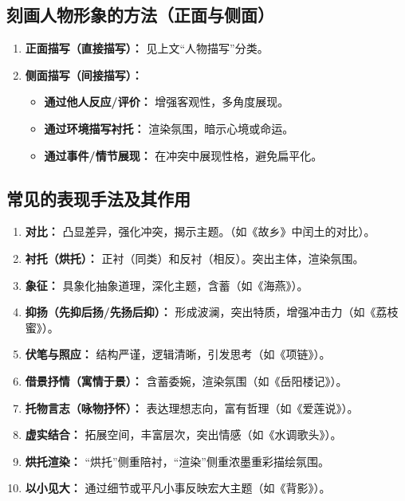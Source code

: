 \documentclass[11pt, a4paper]{ctexart}
\begin{document}
\subsection{刻画人物形象的方法（正面与侧面）}
\begin{enumerate}
    \item \textbf{正面描写（直接描写）：} 见上文“人物描写”分类。
    \item \textbf{侧面描写（间接描写）：}
    \begin{itemize}
        \item \textbf{通过他人反应/评价：} 增强客观性，多角度展现。
        \item \textbf{通过环境描写衬托：} 渲染氛围，暗示心境或命运。
        \item \textbf{通过事件/情节展现：} 在冲突中展现性格，避免扁平化。
    \end{itemize}
\end{enumerate}

\subsection{常见的表现手法及其作用}
\begin{enumerate}
    \item \textbf{对比：} 凸显差异，强化冲突，揭示主题。（如《故乡》中闰土的对比）。
    \item \textbf{衬托（烘托）：} 正衬（同类）和反衬（相反）。突出主体，渲染氛围。
    \item \textbf{象征：} 具象化抽象道理，深化主题，含蓄（如《海燕》）。
    \item \textbf{抑扬（先抑后扬/先扬后抑）：} 形成波澜，突出特质，增强冲击力（如《荔枝蜜》）。
    \item \textbf{伏笔与照应：} 结构严谨，逻辑清晰，引发思考（如《项链》）。
    \item \textbf{借景抒情（寓情于景）：} 含蓄委婉，渲染氛围（如《岳阳楼记》）。
    \item \textbf{托物言志（咏物抒怀）：} 表达理想志向，富有哲理（如《爱莲说》）。
    \item \textbf{虚实结合：} 拓展空间，丰富层次，突出情感（如《水调歌头》）。
    \item \textbf{烘托渲染：} “烘托”侧重陪衬，“渲染”侧重浓墨重彩描绘氛围。
    \item \textbf{以小见大：} 通过细节或平凡小事反映宏大主题（如《背影》）。
\end{enumerate}
\end{document}
